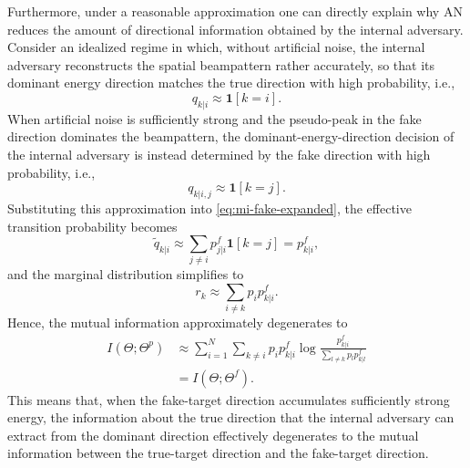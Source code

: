 \documentclass[conference,twocolumn,a4paper]{IEEEtran}
\begin{document}
Furthermore, under a reasonable approximation one can directly explain why AN reduces the amount of directional information obtained by the internal adversary. Consider an idealized regime in which, without artificial noise, the internal adversary reconstructs the spatial beampattern rather accurately, so that its dominant energy direction matches the true direction with high probability, i.e.,
\begin{equation}
q_{k|i}\approx \mathbf{1}[k=i].
\end{equation}
When artificial noise is sufficiently strong and the pseudo-peak in the fake direction dominates the beampattern, the dominant-energy-direction decision of the internal adversary is instead determined by the fake direction with high probability, i.e.,
\begin{equation}
q_{k|i,j}\approx \mathbf{1}[k=j].
\end{equation}
Substituting this approximation into \eqref{eq:mi-fake-expanded}, the effective transition probability becomes
\begin{equation}
\widetilde q_{k|i}
\approx \sum_{j\neq i} p_{j|i}^{f}\mathbf{1}[k=j]
=p_{k|i}^{f},
\end{equation}
and the marginal distribution simplifies to
\begin{equation}
r_k\approx \sum_{i\neq k} p_i p_{k|i}^{f}.
\end{equation}
Hence, the mutual information approximately degenerates to
\begin{equation}
\begin{aligned}
I(\Theta;\Theta^p)
&\approx \sum_{i=1}^{N}\sum_{k\neq i} p_i p_{k|i}^{f}
\log
\frac{p_{k|i}^{f}}{\sum_{l\neq k} p_l p_{k|l}^{f}} \\
&= I(\Theta;\Theta^f).
\end{aligned}
\label{eq:mi-approx}
\end{equation}
This means that, when the fake-target direction accumulates sufficiently strong energy, the information about the true direction that the internal adversary can extract from the dominant direction effectively degenerates to the mutual information between the true-target direction and the fake-target direction.
\end{document}
